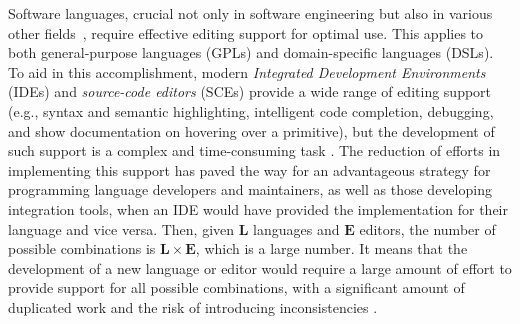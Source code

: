 Software languages, crucial not only in software engineering but also in various other fields~\cite{Paulin93, Colmerauer90}, require effective editing support for optimal use.
This applies to both general-purpose languages (GPLs) and domain-specific languages (DSLs).
To aid in this accomplishment, modern \textit{Integrated Development Environments} (IDEs) and \textit{source-code editors} (SCEs) provide a wide range of editing support (e.g., syntax and semantic highlighting, intelligent code completion, debugging, and show documentation on hovering over a primitive), but the development of such support is a complex and time-consuming task \cite{Rodriguez-Echeverria18}.
The reduction of efforts in implementing this support has paved the way for an advantageous strategy for programming language developers and maintainers, as well as those developing integration tools, when an IDE would have provided the implementation for their language and vice versa.
Then, given $\mathbf{L}$ languages and $\mathbf{E}$ editors, the number of possible combinations is $\mathbf{L} \times \mathbf{E}$, which is a large number.
It means that the development of a new language or editor would require a large amount of effort to provide support for all possible combinations, with a significant amount of duplicated work and the risk of introducing inconsistencies \cite{Rask21}.

